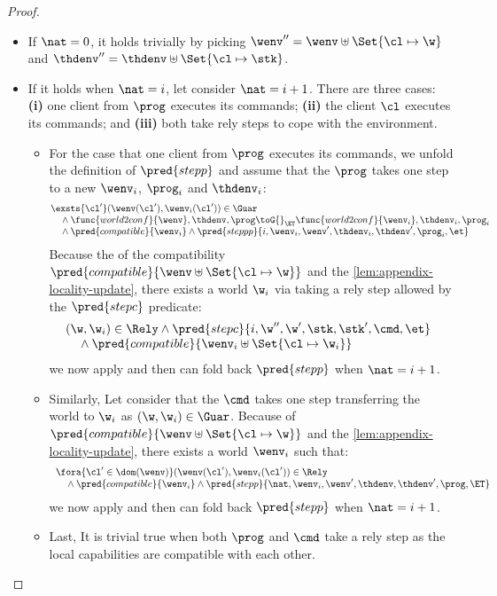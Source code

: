 \begin{proof}
\begin{itemize}
\begin{itemize}
    \item If \( \nat = 0\), it holds trivially by picking \( \wenv'' = \wenv \uplus \Set{\cl \mapsto \w} \) and \( \thdenv'' = \thdenv \uplus \Set{\cl \mapsto \stk}\).

    \item If it holds when \( \nat = i\), let consider \( \nat = i + 1\).
    There are three cases: \textbf{(i)} one client from \( \prog \) executes its commands; \textbf{(ii)} the client \( \cl \) executes its commands; and \textbf{(iii)} both take rely steps to cope with the environment.
    \begin{itemize}
        \item For the case that one client from \( \prog \) executes its commands, we unfold the definition of \( \pred{stepp} \) and assume that the \( \prog \) takes one step to a new \( \wenv_i\), \( \prog_i \) and \( \thdenv_i \):
        \[
        \begin{array}{@{}l}
            \exsts{\cl'} (\wenv(\cl'), \wenv_i(\cl')) \in \Guar \\ 
            \quad {} \land \func{world2conf}{\wenv}, \thdenv, \prog \toG{}_{\ET} \func{world2conf}{\wenv_i}, \thdenv_i, \prog_i  \\
            \quad {} \land \pred{compatible}{\wenv_i} \land \pred{steppp}{i, \wenv_i, \wenv', \thdenv_i, \thdenv', \prog_i, \et}
        \end{array}
        \]
        Because the of the compatibility \( \pred{compatible}{\wenv \uplus \Set{\cl \mapsto \w}} \) and the \cref{lem:appendix-locality-update}, there exists a world \( \w_i\) via taking a rely step allowed by the \( \pred{stepc} \) predicate:
        \[
        \begin{array}{@{}l}
            (\w, \w_i) \in \Rely \land \pred{stepc}{i, \w'', \w', \stk, \stk', \cmd, \et} \\
            \quad {} \land \pred{compatible}{\wenv_i \uplus \Set{\cl \mapsto \w_i}}
        \end{array}
        \]
        we now apply \ih and then can fold back \( \pred{stepp} \) when \( \nat = i + 1 \).
        \item Similarly, Let consider that the \( \cmd \) takes one step transferring the world to \( \w_i \) as \( (\w, \w_i) \in \Guar \).
        Because of \( \pred{compatible}{\wenv \uplus \Set{\cl \mapsto \w}} \) and the \cref{lem:appendix-locality-update}, there exists a world \( \wenv_i\) such that:
        \[
            \begin{array}{l}
            \fora{\cl' \in \dom(\wenv)} (\wenv(\cl'), \wenv_i(\cl')) \in \Rely \\
            \quad {} \land \pred{compatible}{\wenv_i} \land \pred{stepp}{ \nat, \wenv_i, \wenv', \thdenv, \thdenv',\prog, \ET} 
            \end{array}
        \]
        we now apply \ih and then can fold back \( \pred{stepp} \) when \( \nat = i + 1 \).
        \item Last, It is trivial true when both \( \prog\) and \( \cmd \) take a rely step as the local capabilities are compatible with each other.


\end{itemize}
\end{itemize}
\end{itemize}
\end{proof}
